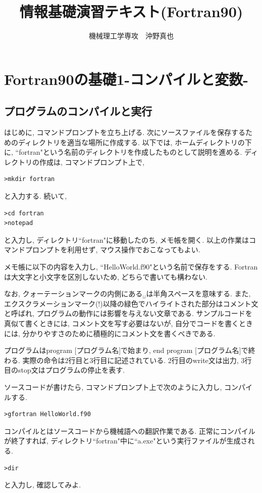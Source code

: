 \documentclass[a4j]{jsbook}
\begin{document}
\title{情報基礎演習テキスト(Fortran90)}
\author{機械理工学専攻　沖野真也}
\date{}
\maketitle

\chapter{Fortran90の基礎1-コンパイルと変数-}

\section{プログラムのコンパイルと実行}
はじめに, コマンドプロンプトを立ち上げる.
次にソースファイルを保存するためのディレクトリを適当な場所に作成する.
以下では, ホームディレクトリの下に, ``fortran"という名前のディレクトリを作成したものとして説明を進める.
ディレクトリの作成は, コマンドプロンプト上で,
\begin{Verbatim}[frame=single]
>mkdir fortran
\end{Verbatim}
と入力する. 続いて,
\begin{Verbatim}[frame=single]
>cd fortran
>notepad
\end{Verbatim}
と入力し, ディレクトリ``fortran"に移動したのち, メモ帳を開く.
以上の作業はコマンドプロンプトを利用せず, マウス操作でおこなってもよい.

メモ帳に以下の内容を入力し, ``HelloWorld.f90"という名前で保存をする.
Fortranは大文字と小文字を区別しないため, どちらで書いても構わない.

なお, クォーテーションマークの内側にある$_{\sqcup}$は半角スペースを意味する.
また, エクスクラメーションマーク(!)以降の緑色でハイライトされた部分はコメント文と呼ばれ,
プログラムの動作には影響を与えない文章である.
サンプルコードを真似て書くときには, コメント文を写す必要はないが,
自分でコードを書くときには, 分かりやすさのために積極的にコメント文を書くべきである.

プログラムはprogram [プログラム名]で始まり, end program [プログラム名]で終わる.
実際の命令は2行目と3行目に記述されている.
2行目のwrite文は出力, 3行目のstop文はプログラムの停止を表す.


ソースコードが書けたら, コマンドプロンプト上で次のように入力し, コンパイルする.
\begin{Verbatim}[frame=single]
>gfortran HelloWorld.f90
\end{Verbatim}
コンパイルとはソースコードから機械語への翻訳作業である.
正常にコンパイルが終了すれば, ディレクトリ``fortran"中に``a.exe"という実行ファイルが生成される.
\begin{Verbatim}[frame=single]
>dir
\end{Verbatim}
と入力し, 確認してみよ.
\end{document}
